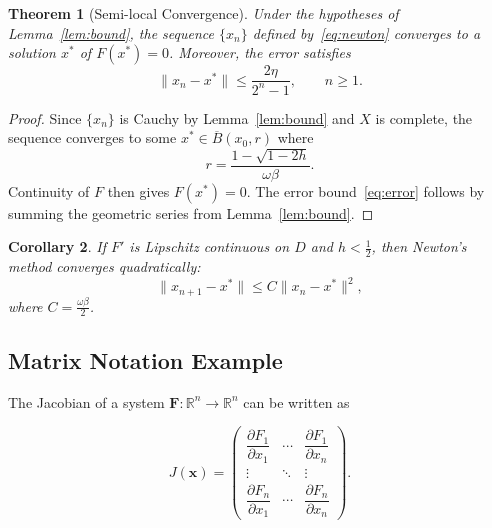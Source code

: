 \documentclass[12pt, a4paper]{article}
\theoremstyle{plain}       %
\newtheorem{theorem}{Theorem}[section]
\newtheorem{corollary}[theorem]{Corollary}
\theoremstyle{definition}  %
\theoremstyle{remark}      %
\begin{document}
\begin{theorem}[Semi-local Convergence]
    \label{thm:convergence}
    Under the hypotheses of Lemma~\ref{lem:bound}, the sequence $\{x_n\}$
    defined by~\eqref{eq:newton} converges to a solution $x^{*}$ of
    $F(x^{*}) = 0$.  Moreover, the error satisfies
    \begin{equation}
        \lVert x_n - x^{*} \rVert
            \leq \frac{2\eta}{2^{n} - 1},
            \qquad n \geq 1.
        \label{eq:error}
    \end{equation}
\end{theorem}

\begin{proof}
    Since $\{x_n\}$ is Cauchy by Lemma~\ref{lem:bound} and $X$ is complete,
    the sequence converges to some $x^{*} \in \overline{B}(x_0, r)$ where
    \[
        r = \frac{1 - \sqrt{1 - 2h}}{\omega \beta}.
    \]
    Continuity of $F$ then gives $F(x^{*}) = 0$.  The error
    bound~\eqref{eq:error} follows by summing the geometric series from
    Lemma~\ref{lem:bound}.
\end{proof}

\begin{corollary}
    \label{cor:quadratic}
    If $F'$ is Lipschitz continuous on $D$ and $h < \tfrac{1}{2}$, then
    Newton's method converges \emph{quadratically}:
    \begin{equation}
        \lVert x_{n+1} - x^{*} \rVert
            \leq C \lVert x_n - x^{*} \rVert^{2},
    \end{equation}
    where $C = \tfrac{\omega \beta}{2}$.
\end{corollary}

\subsection{Matrix Notation Example}
\label{subsec:matrix}

The Jacobian of a system $\mathbf{F} \colon \mathbb{R}^{n} \to
\mathbb{R}^{n}$ can be written as

\begin{equation}
    J(\mathbf{x}) =
    \begin{pmatrix}
        \dfrac{\partial F_1}{\partial x_1} & \cdots &
            \dfrac{\partial F_1}{\partial x_n} \\[8pt]
        \vdots & \ddots & \vdots \\[4pt]
        \dfrac{\partial F_n}{\partial x_1} & \cdots &
            \dfrac{\partial F_n}{\partial x_n}
    \end{pmatrix}.
    \label{eq:jacobian}
\end{equation}
\end{document}
